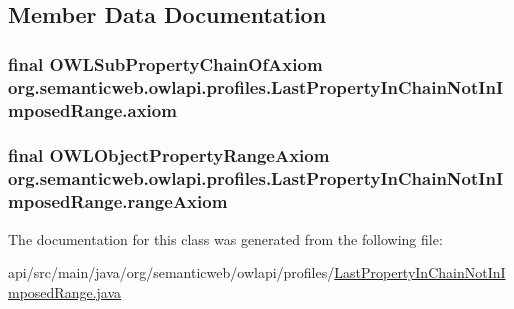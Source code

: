 \subsection{Member Data Documentation}
\hypertarget{classorg_1_1semanticweb_1_1owlapi_1_1profiles_1_1_last_property_in_chain_not_in_imposed_range_a111c0b3449dd5868fd68e55ca1378352}{
\subsubsection[{axiom}]{\setlength{\rightskip}{0pt plus 5cm}final {\bf O\-W\-L\-Sub\-Property\-Chain\-Of\-Axiom} org.\-semanticweb.\-owlapi.\-profiles.\-Last\-Property\-In\-Chain\-Not\-In\-Imposed\-Range.\-axiom\hspace{0.3cm}{\ttfamily [private]}}}\label{classorg_1_1semanticweb_1_1owlapi_1_1profiles_1_1_last_property_in_chain_not_in_imposed_range_a111c0b3449dd5868fd68e55ca1378352}
\hypertarget{classorg_1_1semanticweb_1_1owlapi_1_1profiles_1_1_last_property_in_chain_not_in_imposed_range_a950663ea9305a01b3518d6cd85851512}{
\subsubsection[{range\-Axiom}]{\setlength{\rightskip}{0pt plus 5cm}final {\bf O\-W\-L\-Object\-Property\-Range\-Axiom} org.\-semanticweb.\-owlapi.\-profiles.\-Last\-Property\-In\-Chain\-Not\-In\-Imposed\-Range.\-range\-Axiom\hspace{0.3cm}{\ttfamily [private]}}}\label{classorg_1_1semanticweb_1_1owlapi_1_1profiles_1_1_last_property_in_chain_not_in_imposed_range_a950663ea9305a01b3518d6cd85851512}


The documentation for this class was generated from the following file\-:\begin{DoxyCompactItemize}
\item 
api/src/main/java/org/semanticweb/owlapi/profiles/\hyperlink{_last_property_in_chain_not_in_imposed_range_8java}{Last\-Property\-In\-Chain\-Not\-In\-Imposed\-Range.\-java}\end{DoxyCompactItemize}
